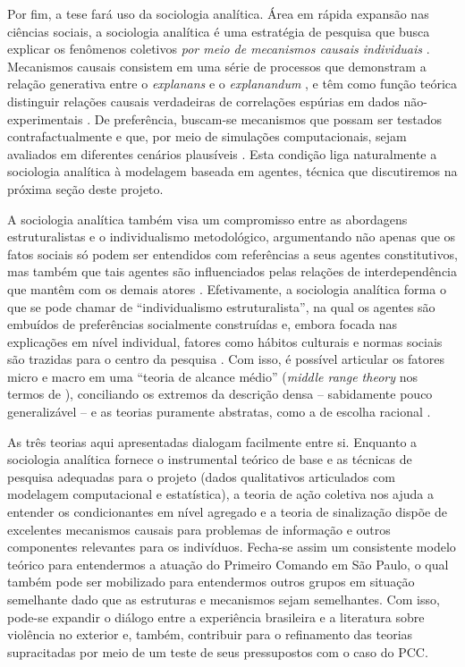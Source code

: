 \documentclass[a4paper,11pt]{article}
\begin{document}
Por fim, a tese fará uso da sociologia analítica. Área em rápida expansão nas ciências sociais, a sociologia analítica é uma estratégia de pesquisa que busca explicar os fenômenos coletivos \textit{por meio de mecanismos causais individuais} \citep{hedstrom1998social}. Mecanismos causais consistem em uma série de processos que demonstram a relação generativa entre o \textit{explanans} e o \textit{explanandum} \citep[5]{little1991varieties}, e têm como função teórica distinguir relações causais verdadeiras de correlações espúrias em dados não-experimentais \citep[54]{hedstrom2010causal}. De preferência, buscam-se mecanismos que possam ser testados contrafactualmente e que, por meio de simulações computacionais, sejam avaliados em diferentes cenários plausíveis \citep{macy2002factors}. Esta condição liga naturalmente a sociologia analítica à modelagem baseada em agentes, técnica que discutiremos na próxima seção deste projeto.

A sociologia analítica também visa um compromisso entre as abordagens estruturalistas e o individualismo metodológico, argumentando não apenas que os fatos sociais só podem ser entendidos com referências a seus agentes constitutivos, mas também que tais agentes são influenciados pelas relações de interdependência que mantêm com os demais atores \citep[4]{demeulenaere2011analytical}. Efetivamente, a sociologia analítica forma o que se pode chamar de ``individualismo estruturalista'', na qual os agentes são embuídos de preferências socialmente construídas e, embora focada nas explicações em nível individual, fatores como hábitos culturais e normas sociais são trazidas para o centro da pesquisa \citep{hedstrom2009analytical}. Com isso, é possível articular os fatores micro e macro em uma ``teoria de alcance médio'' (\textit{middle range theory} nos termos de \citet{merton1973sociology}), conciliando os extremos da descrição densa -- sabidamente pouco generalizável -- e as teorias puramente abstratas, como a de escolha racional \citep{little2012explanatory}.

As três teorias aqui apresentadas dialogam facilmente entre si. Enquanto a sociologia analítica fornece o instrumental teórico de base e as técnicas de pesquisa adequadas para o projeto (dados qualitativos articulados com modelagem computacional e estatística), a teoria de ação coletiva nos ajuda a entender os condicionantes em nível agregado e a teoria de sinalização dispõe de excelentes mecanismos causais para problemas de informação e outros componentes relevantes para os indivíduos. Fecha-se assim um consistente modelo teórico para entendermos a atuação do Primeiro Comando em São Paulo, o qual também pode ser mobilizado para entendermos outros grupos em situação semelhante dado que as estruturas e mecanismos sejam semelhantes. Com isso, pode-se expandir o diálogo entre a experiência brasileira e a literatura sobre violência no exterior e, também, contribuir para o refinamento das teorias supracitadas por meio de um teste de seus pressupostos com o caso do PCC. 
\end{document}
